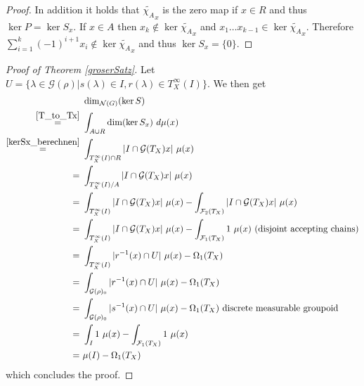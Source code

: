 \documentclass[12pt,a4paper]{scrartcl}
\theoremstyle{plain}
\theoremstyle{definition}
\numberwithin{equation}{section}
\newcommand{\2}{\mathbb{Z} / 2 \mathbb{Z}}
\newcommand{\G}{\mathcal{G}}
\newcommand{\1}{\bar{1}}
\newcommand{\0}{\bar{0}}
\begin{document}
\begin{proof}
	
	In addition it holds that $\tilde{\chi_A}_x$ is the zero map if $x \in R$ and thus $\ker P = \ker S_x$. If $x \in A$ then $x_k \notin \ker \tilde{\chi_A}_x$ and $x_1 \ldots x_{k - 1} \in \ker \tilde{\chi_A}_x$. Therefore $\sum_{i = 1}^{k} (-1)^{i + 1} x_i \notin \ker \tilde{\chi_A}_x$ and thus $\ker S_x = \{0\}$.
\end{proof}
\begin{proof}[Proof of Theorem \ref{groserSatz}]
	Let $U = \{\lambda \in \G (\rho)| s(\lambda) \in I, r(\lambda) \in T_X^\infty(I)\}$. We then get
	\begin{align*}
		 &~ \dim_{\mathcal{N}(G)}(\ker S) \\
		\overset{\ref{T_to_Tx}}{=}&~ \int_{A \cup R} \dim (\ker S_x) \ d \mu (x) \\
		\overset{\ref{kerSx_berechnen}}{=}&~ \int_{T_X^\infty(I) \cap R} |I \cap \G (T_X)x| \ \mu (x) \\
		=&~ \int_{T_X^\infty(I) / A} |I \cap \G (T_X)x| \ \mu (x) \\
		=&~ \int_{T_X^\infty(I)} |I \cap \G (T_X)x| \ \mu (x) - \int_{\mathcal{F}_2(T_X)} |I \cap \G (T_X)x| \ \mu (x) \\
		=&~ \int_{T_X^\infty(I)} |I \cap \G (T_X)x| \ \mu (x) - \int_{\mathcal{F}_1(T_X)} 1 \ \mu (x) \ \text{(disjoint accepting chains)}\\
		=&~ \int_{T_X^\infty(I)} |r^{-1}(x) \cap U| \ \mu (x) - \Omega_1(T_X) \\
		=&~ \int_{\G (\rho)_0} |r^{-1}(x) \cap U| \ \mu (x) - \Omega_1(T_X) \\
		=&~ \int_{\G (\rho)_0} |s^{-1}(x) \cap U| \ \mu (x) - \Omega_1(T_X) \ \text{discrete measurable groupoid} \\
		=&~ \int_{I} 1 \ \mu (x) - \int_{\mathcal{F}_1(T_X)} 1 \ \mu (x) \\
		=&~ \mu(I) - \Omega_1(T_X)
	\end{align*}
	which concludes the proof.
\end{proof}
\end{document}
